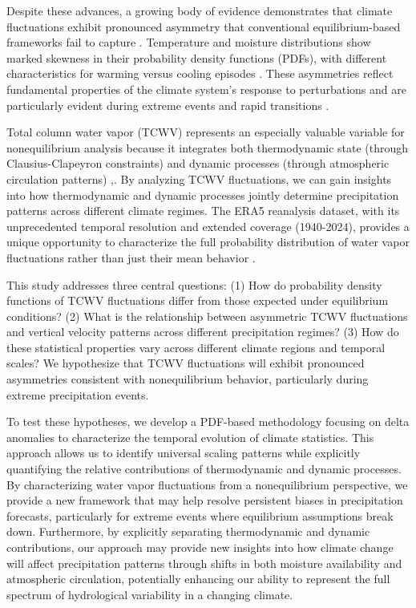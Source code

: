 \documentclass{article}
\begin{document}
Despite these advances, a growing body of evidence demonstrates that
climate fluctuations exhibit pronounced asymmetry that conventional
equilibrium-based frameworks fail to capture
\cite{yin_nonequilibrium_2024}. Temperature and moisture distributions
show marked skewness in their probability density functions (PDFs), with
different characteristics for warming versus cooling episodes
\cite{ruff2012long}. These asymmetries reflect fundamental properties of
the climate system's response to perturbations and are particularly
evident during extreme events and rapid transitions
\cite{lucarini2012universal}.

Total column water vapor (TCWV) represents an especially valuable
variable for nonequilibrium analysis because it integrates both
thermodynamic state (through Clausius-Clapeyron constraints) and dynamic
processes (through atmospheric circulation patterns)
\cite{held2006robust},\cite{o2010closely}. By analyzing TCWV fluctuations,
we can gain insights into how thermodynamic and dynamic processes
jointly determine precipitation patterns across different climate
regimes. The ERA5 reanalysis dataset, with its unprecedented temporal
resolution and extended coverage (1940-2024), provides a unique
opportunity to characterize the full probability distribution of water
vapor fluctuations rather than just their mean behavior
\cite{era5_monthly_single_levels}.

This study addresses three central questions: (1) How do probability
density functions of TCWV fluctuations differ from those expected under
equilibrium conditions? (2) What is the relationship between asymmetric
TCWV fluctuations and vertical velocity patterns across different
precipitation regimes? (3) How do these statistical properties vary
across different climate regions and temporal scales? We hypothesize
that TCWV fluctuations will exhibit pronounced asymmetries consistent
with nonequilibrium behavior, particularly during extreme precipitation
events.

To test these hypotheses, we develop a PDF-based methodology focusing on
delta anomalies to characterize the temporal evolution of climate
statistics. This approach allows us to identify universal scaling
patterns while explicitly quantifying the relative contributions of
thermodynamic and dynamic processes. By characterizing water vapor
fluctuations from a nonequilibrium perspective, we provide a new
framework that may help resolve persistent biases in precipitation
forecasts, particularly for extreme events where equilibrium assumptions
break down. Furthermore, by explicitly separating thermodynamic and
dynamic contributions, our approach may provide new insights into how
climate change will affect precipitation patterns through shifts in both
moisture availability and atmospheric circulation, potentially enhancing
our ability to represent the full spectrum of hydrological variability
in a changing climate.
\end{document}
